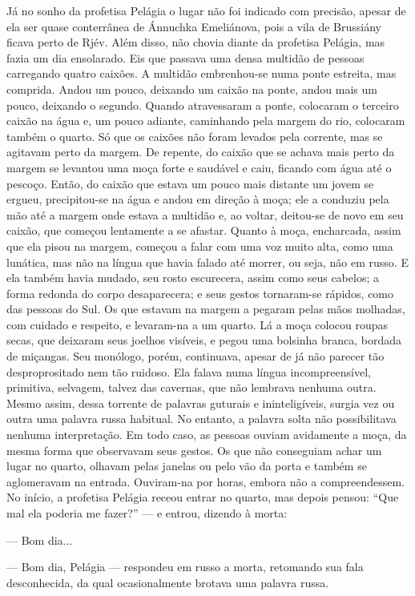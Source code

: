 Já no sonho da profetisa Pelágia o lugar não foi indicado com precisão,
apesar de ela ser quase conterrânea de Ánnuchka Emeliánova, pois a vila
de Brussiány ficava perto de Rjév. Além disso, não chovia diante da
profetisa Pelágia, mas fazia um dia ensolarado. Eis que passava uma
densa multidão de pessoas carregando quatro caixões. A multidão
embrenhou-se numa ponte estreita, mas comprida. Andou um pouco, deixando
um caixão na ponte, andou mais um pouco, deixando o segundo. Quando
atravessaram a ponte, colocaram o terceiro caixão na água e, um pouco
adiante, caminhando pela margem do rio, colocaram também o quarto. Só
que os caixões não foram levados pela corrente, mas se agitavam perto da
margem. De repente, do caixão que se achava mais perto da margem se
levantou uma moça forte e saudável e caiu, ficando com água até o
pescoço. Então, do caixão que estava um pouco mais distante um jovem se
ergueu, precipitou-se na água e andou em direção à moça; ele a conduziu
pela mão até a margem onde estava a multidão e, ao voltar, deitou-se de
novo em seu caixão, que começou lentamente a se afastar. Quanto à moça,
encharcada, assim que ela pisou na margem, começou a falar com uma voz
muito alta, como uma lunática, mas não na língua que havia falado até
morrer, ou seja, não em russo. E ela também havia mudado, seu rosto
escurecera, assim como seus cabelos; a forma redonda do corpo
desaparecera; e seus gestos tornaram-se rápidos, como das pessoas do
Sul. Os que estavam na margem a pegaram pelas mãos molhadas, com cuidado
e respeito, e levaram-na a um quarto. Lá a moça colocou roupas secas,
que deixaram seus joelhos visíveis, e pegou uma bolsinha branca, bordada
de miçangas. Seu monólogo, porém, continuava, apesar de já não parecer
tão desproprositado nem tão ruidoso. Ela falava numa língua
incompreensível, primitiva, selvagem, talvez das cavernas, que não
lembrava nenhuma outra. Mesmo assim, dessa torrente de palavras guturais
e ininteligíveis, surgia vez ou outra uma palavra russa habitual. No
entanto, a palavra solta não possibilitava nenhuma interpretação. Em
todo caso, as pessoas ouviam avidamente a moça, da mesma forma que
observavam seus gestos. Os que não conseguiam achar um lugar no quarto,
olhavam pelas janelas ou pelo vão da porta e também se aglomeravam na
entrada. Ouviram-na por horas, embora não a compreendessem. No início, a
profetisa Pelágia receou entrar no quarto, mas depois pensou: ``Que mal
ela poderia me fazer?'' --- e entrou, dizendo à morta:

--- Bom dia...

--- Bom dia, Pelágia --- respondeu em russo a morta, retomando sua fala
desconhecida, da qual ocasionalmente brotava uma palavra russa.

